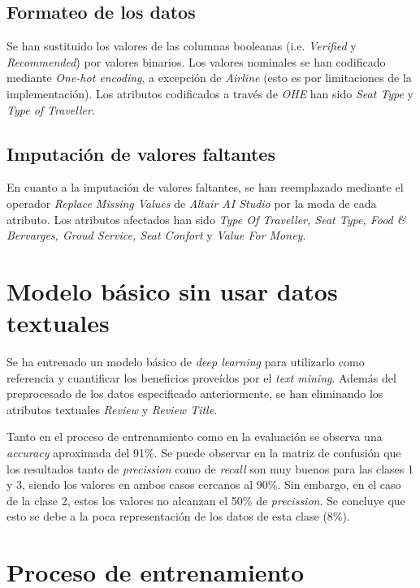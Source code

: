 \documentclass[es]{uc3mreport}
\begin{document}
\begin{report}
\subsection{Formateo de los datos}
\label{sec:formateo}
Se han sustituido los valores de las columnas booleanas (i.e. \textit{Verified} y \textit{Recommended}) por valores binarios. Los valores nominales se han codificado mediante \textit{One-hot encoding}, a excepción de \textit{Airline} (esto es por limitaciones de la implementación). Los atributos codificados a través de \textit{OHE} han sido \textit{Seat Type} y \textit{Type of Traveller}.

\subsection{Imputación de valores faltantes}
\label{sec:imputacion}
En cuanto a la imputación de valores faltantes, se han reemplazado mediante el operador \textit{Replace Missing Values} de \textit{Altair AI Studio} por la moda de cada atributo. Los atributos afectados han sido \textit{Type Of Traveller, Seat Type, Food \& Bervarges, Groud Service, Seat Confort} y \textit{Value For Money}.

\section{Modelo básico sin usar datos textuales}
\label{chap:basicModel}
Se ha entrenado un modelo básico de \textit{deep learning} para utilizarlo como referencia y cuantificar los beneficios proveídos %
por el \textit{text mining}. Además del preprocesado de los datos especificado anteriormente, se han eliminando los atributos textuales \textit{Review} y \textit{Review Title}.

Tanto en el proceso de entrenamiento como en la evaluación se observa una \textit{accuracy} aproximada del 91\%. Se puede observar en la matriz de confusión que los resultados tanto de \textit{precission} como de \textit{recall} son muy buenos para las clases 1 y 3, siendo los valores en ambos casos cercanos al 90\%. Sin embargo, en el caso de la clase 2, estos los valores no alcanzan el 50\% de \textit{precission}. Se concluye que esto se debe a la poca representación de los datos de esta clase (8\%).

\section{Proceso de entrenamiento}
\label{chap:train}


\end{report}
\end{document}
